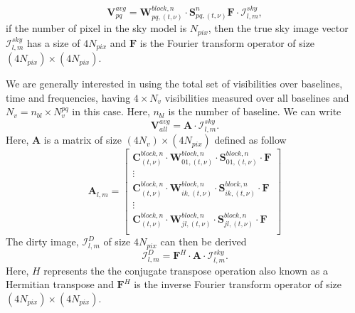 \documentclass[useAMS,usenatbib]{mn2e}
\begin{document}
\begin{equation}
\mathbf{V}_{pq}^{avg}= \mathbf{W}_{pq,(t,\nu)}^{block,n}\cdot 
\mathbf{S}_{pq,(t,\nu)}^{n}\mathbf{F}\cdot\mathcal{I}_{l,m}^{sky},\label{eqv:linear}
\end{equation}
if the number of pixel in the sky model is $N_{pix}$, then the true sky image vector $\mathcal{I}_{l,m}^{sky}$ has a size of $4N_{pix}$ and 
$\textbf{F}$ is the Fourier transform operator of size $(4N_{pix})\times(4N_{pix})$. 

We are generally interested in using the total set of visibilities over baselines, time and frequencies, having $4\times N_v$ visibilities 
measured over all baselines  and $N_v=n_{bl}\times N_v^{pq}$ in this case. Here, $n_{bl}$ is the number of baseline. We can write
\begin{equation}
 \mathbf{V}_{all}^{avg}=\mathbf{A}\cdot\mathcal{I}_{l,m}^{sky}.
\end{equation}
Here, $\mathbf{A}$ is a matrix of size $(4N_v)\times (4N_{pix})$ defined as follow
\begin{equation*}
\mathbf{A}_{l,m}=
  \begin{bmatrix}
    \mathbf{C}_{(t,\nu)}^{block,n}\cdot \mathbf{W}_{01,(t,\nu)}^{block,n}\cdot \mathbf{S}_{01,(t,\nu)}^{block,n} \cdot\mathbf{F}\\
    \vdots\\
    \mathbf{C}_{(t,\nu)}^{block,n}\cdot \mathbf{W}_{ik,(t,\nu)}^{block,n}\cdot \mathbf{S}_{ik,(t,\nu)}^{block,n} \cdot\mathbf{F}\\
    \vdots \\
    \mathbf{C}_{(t,\nu)}^{block,n}\cdot \mathbf{W}_{jl,(t,\nu)}^{block,n}\cdot \mathbf{S}_{jl,(t,\nu)}^{block,n} \cdot\mathbf{F}\\
  \end{bmatrix}
\end{equation*}
The 
dirty image, $\mathcal{I}_{l,m}^{D}$ of size $4N_{pix}$ can then be derived
\begin{equation}
\mathcal{I}_{l,m}^{D}=\mathbf{F}^{H}\cdot\mathbf{A}\cdot\mathcal{I}_{l,m}^{sky}.
\end{equation}
Here, $H$ represents the the conjugate transpose operation also known as a Hermitian transpose and $\mathbf{F}^{H}$ is the inverse 
Fourier transform operator of size $(4N_{pix})\times(4N_{pix})$.
\end{document}
